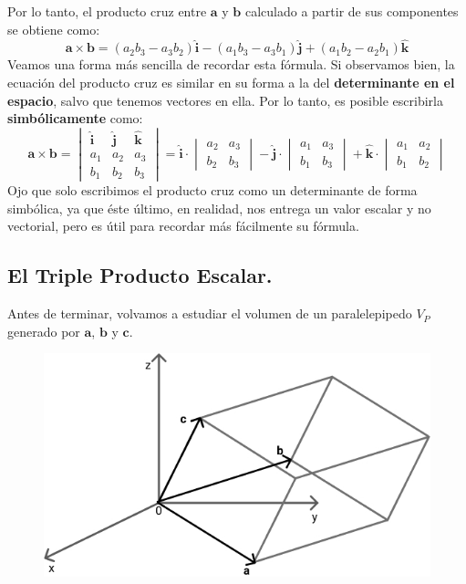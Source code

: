 \documentclass[12pt]{article}
\begin{document}
Por lo tanto, el producto cruz entre $\mathbf{a}$ y $\mathbf{b}$ calculado a partir de sus componentes se obtiene como:
\[
\mathbf{a} \times \mathbf{b} = (a_{2}b_{3} - a_{3}b_{2}) \hat{\mathbf{i}} - (a_{1}b_{3} - a_{3}b_{1}) \hat{\mathbf{j}} + 
                               (a_{1}b_{2} - a_{2}b_{1}) \hat{\mathbf{k}}
\]
Veamos una forma más sencilla de recordar esta fórmula. Si observamos bien, la ecuación del producto cruz es similar en su forma a la del \textbf{determinante en el espacio}, salvo que tenemos vectores en ella. Por lo tanto, es posible escribirla \textbf{simbólicamente} como:
\[
\mathbf{a} \times \mathbf{b} =
\begin{vmatrix}
\hat{\mathbf{i}} & \hat{\mathbf{j}} & \hat{\mathbf{k}} \\
a_{1} & a_{2} & a_{3} \\
b_{1} & b_{2} & b_{3}
\end{vmatrix} =
\hat{\mathbf{i}} \cdot
\begin{vmatrix}
a_{2} & a_{3} \\
b_{2} & b_{3}
\end{vmatrix}
- \hat{\mathbf{j}} \cdot
\begin{vmatrix}
a_{1} & a_{3} \\
b_{1} & b_{3}
\end{vmatrix}
+ \hat{\mathbf{k}} \cdot
\begin{vmatrix}
a_{1} & a_{2} \\
b_{1} & b_{2}
\end{vmatrix}
\]
Ojo que solo escribimos el producto cruz como un determinante de forma simbólica, ya que éste último, en realidad, nos entrega un valor escalar y no vectorial, pero es útil para recordar más fácilmente su fórmula.

\subsection{El Triple Producto Escalar.}

Antes de terminar, volvamos a estudiar el volumen de un paralelepipedo $V_{P}$ generado por $\mathbf{a}$, $\mathbf{b}$ y $\mathbf{c}$.

\newpage

\begin{figure}[hbt!]
\centering
\includegraphics[scale=0.4]{img/det-vol-parallelel-1.jpg}
\end{figure}
\end{document}
